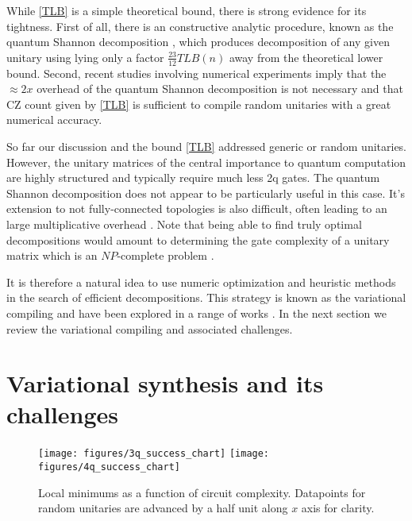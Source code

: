 \documentclass[amsfonts, amssymb, aps, nofootinbib, twocolumn]{revtex4-2}
\newcommand{\CZ}{CZ }
\begin{document}
While \eqref{TLB} is a simple theoretical bound, there is strong evidence for its tightness. First of all, there is an constructive analytic procedure, known as the quantum Shannon decomposition \cite{Shende2006}, which produces decomposition of any given unitary using lying only a factor $\frac{23}{12}TLB(n)$ away from the theoretical lower bound. Second, recent studies involving numerical experiments \cite{Madden2021, Rakyta2021} imply that the $\approx2x$ overhead of the quantum Shannon decomposition is not necessary and that \CZ count given by \eqref{TLB} is sufficient to compile random unitaries with a great numerical accuracy.

So far our discussion and the bound \eqref{TLB} addressed generic or random unitaries. However, the unitary matrices of the central importance to quantum computation are highly structured and typically require much less 2q gates. The quantum Shannon decomposition does not appear to be particularly useful in this case. It's extension to not fully-connected topologies is also difficult, often leading to an large multiplicative overhead \cite{Shende2006}. Note that being able to find truly optimal decompositions would amount to determining the gate complexity of a unitary matrix which is an $NP$-complete problem \cite{Botea2018}.

It is therefore a natural idea to use numeric optimization and heuristic methods in the search of efficient decompositions. This strategy is known as the variational compiling and have been explored in a range of works \cite{}. In the next section we review the variational compiling and associated challenges.

\section{Variational synthesis and its challenges \label{sec local minimums}}

\begin{figure*}
	\texttt{[image: figures/3q\_success\_chart]}
	\texttt{[image: figures/4q\_success\_chart]}
	\caption{Local minimums as a function of circuit complexity. Datapoints for random unitaries are advanced by a half unit along $x$ axis for clarity.}
	\label{fig local minumums}
\end{figure*}
\end{document}
